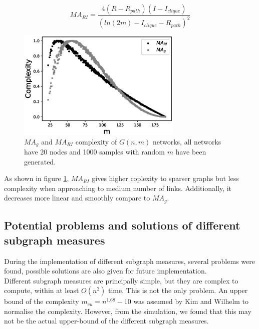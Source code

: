 \documentclass[12pt]{article}
\begin{document}
{\begin{equation}
    MA_{RI} = \frac{4(R-R_{path})(I-I_{clique})}{(ln(2m)-I_{clique}-R_{path})^2}
\end{equation}
\begin{figure}[h]
    \centering
    \includegraphics[width=0.7\textwidth]{mariandmag.eps}
    \caption{$MA_g$ and $MA_{RI}$ complexity of $G(n,m)$ networks, all networks have 20 nodes and 1000 samples with random $m$ have been generated.}
    \label{fig:marimagcompare}
\end{figure}
\noindent

As shown in figure \ref{fig:marimagcompare}, $MA_{RI}$ gives higher coplexity to sparser graphs but less complexity when approaching to medium number of links. Additionally, it decreases more linear and smoothly compare to $MA_g$.

\subsection{Potential problems and solutions of different subgraph measures}
\label{problem}
During the implementation of different subgraph measures, several problems were found, possible solutions are also given for future implementation.\\
Different subgraph measures are principally simple, but they are complex to compute, within at least $O(n^2)$ time\cite{KIM20082637}. This is not the only problem. An upper bound of the complexity $m_{cu} = n^{1.68}-10$ was assumed by Kim and Wilhelm\cite{KIM20082637} to normalise the complexity. However, from the simulation, we found that this may not be the actual upper-bound of the different subgraph measures.

}
\end{document}
